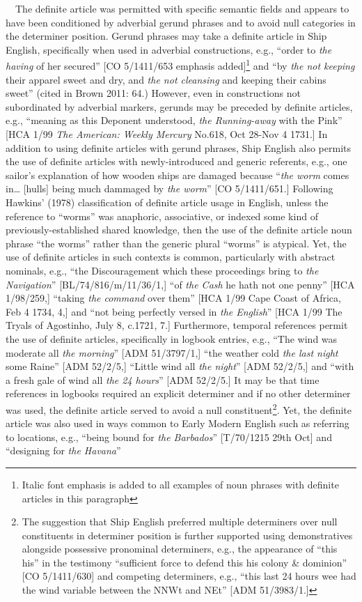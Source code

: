 \documentclass[12pt]{article}
\newenvironment{styleStandard}{\renewcommand\baselinestretch{1.0}\setlength\leftskip{0cm}\setlength\rightskip{0cm plus 1fil}\setlength\parindent{0cm}\setlength\parfillskip{0pt plus 1fil}\setlength\parskip{0in plus 1pt}\writerlistparindent\writerlistleftskip\leavevmode\normalfont\normalsize\writerlistlabel\ignorespaces}{\unskip\vspace{0in plus 1pt}\par}
\newcommand\writerlistleftskip{}
\newcommand\writerlistparindent{}
\newcommand\writerlistlabel{}
\begin{document}
\begin{styleStandard}
\ \ The definite article was permitted with specific semantic fields and appears to have been conditioned by adverbial gerund phrases and to avoid null categories in the determiner position. Gerund phrases may take a definite article in Ship English, specifically when used in adverbial constructions, e.g., “order to \textit{the having} of her secured” [CO 5/1411/653 emphasis added]\footnote{ Italic font emphasis is added to all examples of noun phrases with definite articles in this paragraph} and “by \textit{the not keeping} their apparel sweet and dry, and \textit{the not cleansing} and keeping their cabins sweet” (cited in Brown 2011: 64.) However, even in constructions not subordinated by adverbial markers, gerunds may be preceded by definite articles, e.g., “meaning as this Deponent understood, \textit{the Running-away} with the Pink” [HCA 1/99 \textit{The American: Weekly Mercury }No.618, Oct 28-Nov 4 1731.] In addition to using definite articles with gerund phrases, Ship English also permits the use of definite articles with newly-introduced and generic referents, e.g., one sailor’s explanation of how wooden ships are damaged because “\textit{the worm} comes in… [hulls] being much dammaged by \textit{the worm}” [CO 5/1411/651.] Following Hawkins’ (1978) classification of definite article usage in English, unless the reference to “worms” was anaphoric, associative, or indexed some kind of previously-established shared knowledge, then the use of the definite article noun phrase “the worms” rather than the generic plural “worms” is atypical. Yet, the use of definite articles in such contexts is common, particularly with abstract nominals, e.g., “the Discouragement which these proceedings bring to \textit{the Navigation}” [BL/74/816/m/11/36/1,] “of \textit{the Cash }he hath not one penny” [HCA 1/98/259,] “taking \textit{the command} over them” [HCA 1/99 Cape Coast of Africa, Feb 4 1734, 4,] and “not being perfectly versed in \textit{the English}” [HCA 1/99 The Tryals of Agostinho, July 8, c.1721, 7.] Furthermore, temporal references permit the use of definite articles, specifically in logbook entries, e.g., “The wind was moderate all \textit{the morning}” [ADM 51/3797/1,] “the weather cold \textit{the last night} some Raine” [ADM 52/2/5,] “Little wind all \textit{the night}” [ADM 52/2/5,] and “with a fresh gale of wind all \textit{the 24 hours}” [ADM 52/2/5.] It may be that time references in logbooks required an explicit determiner and if no other determiner was used, the definite article served to avoid a null constituent\footnote{ The suggestion that Ship English preferred multiple determiners over null constituents in determiner position is further supported using demonstratives alongside possessive pronominal determiners, e.g., the appearance of “this his” in the testimony “sufficient force to defend this his colony \& dominion” [CO 5/1411/630] and competing determiners, e.g., “this last 24 hours wee had the wind variable between the NNWt and NEt” [ADM 51/3983/1.]}. Yet, the definite article was also used in ways common to Early Modern English such as referring to locations, e.g., “being bound for \textit{the Barbados}” [T/70/1215 29th Oct] and “designing for \textit{the Havana}” 
\end{styleStandard}
\end{document}
